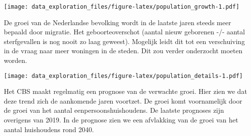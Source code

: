 \documentclass[
]{article}
\newenvironment{Shaded}{\begin{snugshade}}{\end{snugshade}}
\newcommand{\DataTypeTok}[1]{\textcolor[rgb]{0.13,0.29,0.53}{#1}}
\newcommand{\DecValTok}[1]{\textcolor[rgb]{0.00,0.00,0.81}{#1}}
\newcommand{\KeywordTok}[1]{\textcolor[rgb]{0.13,0.29,0.53}{\textbf{#1}}}
\newcommand{\NormalTok}[1]{#1}
\newcommand{\OperatorTok}[1]{\textcolor[rgb]{0.81,0.36,0.00}{\textbf{#1}}}
\newcommand{\StringTok}[1]{\textcolor[rgb]{0.31,0.60,0.02}{#1}}
\begin{document}
\texttt{[image: data\_exploration\_files/figure-latex/population\_growth-1.pdf]}

De groei van de Nederlandse bevolking wordt in de laatste jaren steeds
meer bepaald door migratie. Het geboorteoverschot (aantal nieuw
geborenen -/- aantal sterfgevallen is nog nooit zo laag geweest).
Mogelijk leidt dit tot een verschuiving in de vraag naar meer woningen
in de steden. Dit zou verder onderzocht moeten worden.

\begin{Shaded}
\end{Shaded}

\texttt{[image: data\_exploration\_files/figure-latex/population\_details-1.pdf]}

Het CBS maakt regelmatig een prognose van de verwachte groei. Hier zien
we dat deze trend zich de aankomende jaren voortzet. De groei komt
voornamelijk door de groei van het aantal eenpersoonshuishoudens. De
laatste prognoses zijn overigens van 2019. In de prognose zien we een
afvlakking van de groei van het aantal huishoudens rond 2040.
\end{document}
